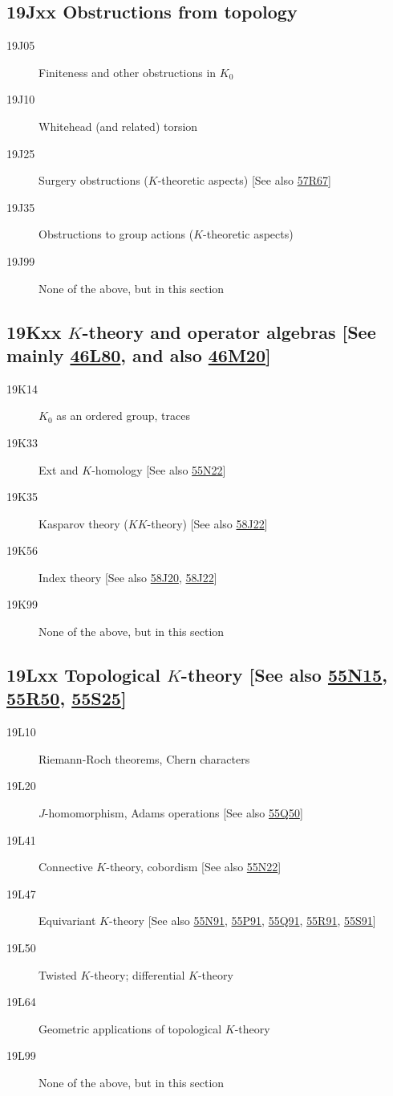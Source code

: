 \documentclass[letterpaper]{article}
\begin{document}
\subsection*{19Jxx  Obstructions from topology }\label{19Jxx}
\begin{description}  
\item [19J05]\label{19J05} Finiteness and other obstructions in $K_0$
\item [19J10]\label{19J10} Whitehead (and related) torsion
\item [19J25]\label{19J25} Surgery obstructions ($K$-theoretic aspects) [See also \hyperref[57R67]{57R67}]
\item [19J35]\label{19J35} Obstructions to group actions ($K$-theoretic aspects)
\item [19J99]\label{19J99} None of the above, but in this section
\end{description}
\subsection*{19Kxx  $K$-theory and operator algebras [See mainly \hyperref[46L80]{46L80}, and also \hyperref[46M20]{46M20}] }\label{19Kxx}
\begin{description}  
\item [19K14]\label{19K14} $K_0$ as an ordered group, traces
\item [19K33]\label{19K33} Ext and $K$-homology [See also \hyperref[55N22]{55N22}]
\item [19K35]\label{19K35} Kasparov theory ($KK$-theory) [See also \hyperref[58J22]{58J22}]
\item [19K56]\label{19K56} Index theory [See also \hyperref[58J20]{58J20}, \hyperref[58J22]{58J22}]
\item [19K99]\label{19K99} None of the above, but in this section
\end{description}
\subsection*{19Lxx  Topological $K$-theory [See also \hyperref[55N15]{55N15}, \hyperref[55R50]{55R50}, \hyperref[55S25]{55S25}] }\label{19Lxx}
\begin{description}  
\item [19L10]\label{19L10} Riemann-Roch theorems, Chern characters
\item [19L20]\label{19L20} $J$-homomorphism, Adams operations [See also \hyperref[55Q50]{55Q50}]
\item [19L41]\label{19L41} Connective $K$-theory, cobordism [See also \hyperref[55N22]{55N22}]
\item [19L47]\label{19L47} Equivariant $K$-theory [See also \hyperref[55N91]{55N91}, \hyperref[55P91]{55P91}, \hyperref[55Q91]{55Q91}, \hyperref[55R91]{55R91}, \hyperref[55S91]{55S91}]
\item [19L50]\label{19L50} Twisted $K$-theory; differential $K$-theory
\item [19L64]\label{19L64} Geometric applications of topological $K$-theory
\item [19L99]\label{19L99} None of the above, but in this section
\end{description}
\end{document}
